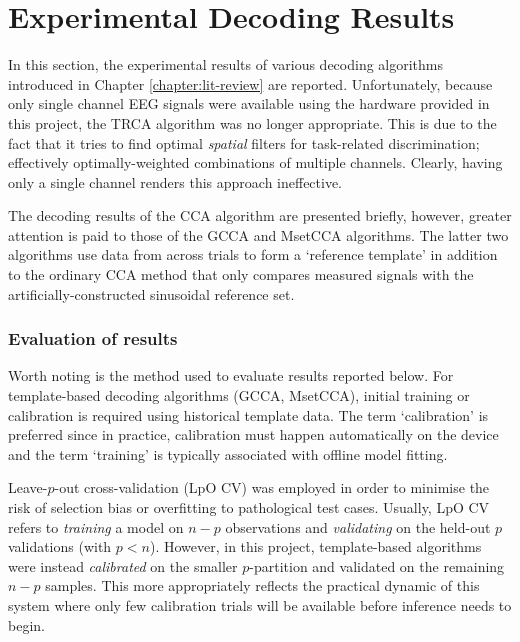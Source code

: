 \section{Experimental Decoding Results}
In this section, the experimental results of various decoding algorithms introduced in Chapter \ref{chapter:lit-review} are reported. Unfortunately, because only single channel EEG signals were available using the hardware provided in this project, the TRCA algorithm was no longer appropriate. This is due to the fact that it tries to find optimal \textit{spatial} filters for task-related discrimination; effectively optimally-weighted combinations of multiple channels. Clearly, having only a single channel renders this approach ineffective. 

The decoding results of the CCA algorithm are presented briefly, however, greater attention is paid to those of the GCCA and MsetCCA algorithms. The latter two algorithms use data from across trials to form a `reference template' in addition to the ordinary CCA method that only compares measured signals with the artificially-constructed sinusoidal reference set. 

\subsubsection{Evaluation of results}
\label{subsection:evaluating-results}
Worth noting is the method used to evaluate results reported below. For template-based decoding algorithms (GCCA, MsetCCA), initial training or calibration is required using historical template data. The term `calibration' is preferred since in practice, calibration must happen automatically on the device and the term `training' is typically associated with offline model fitting.

Leave-$p$-out cross-validation (LpO CV) was employed in order to minimise the risk of selection bias or overfitting to pathological test cases. Usually, LpO CV refers to \textit{training} a model on $n-p$ observations and \textit{validating} on the held-out $p$ validations (with $p<n$). However, in this project, template-based algorithms were instead \textit{calibrated} on the smaller $p$-partition and validated on the remaining $n-p$ samples. This more appropriately reflects the practical dynamic of this system where only few calibration trials will be available before inference needs to begin.

